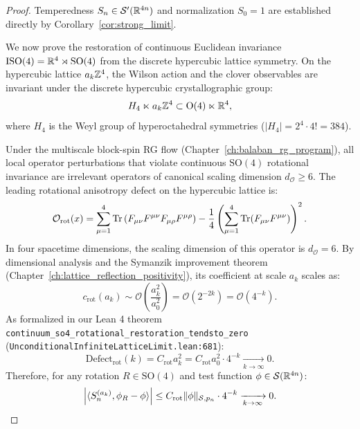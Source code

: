 \begin{proof}
Temperedness $S_n \in \mathcal{S}'(\mathbb{R}^{4n})$ and normalization $S_0 = 1$ are established directly by Corollary~\ref{cor:strong_limit}.

We now prove the restoration of continuous Euclidean invariance $\mathrm{ISO}(4) = \mathbb{R}^4 \rtimes \mathrm{SO}(4)$ from the discrete hypercubic lattice symmetry. On the hypercubic lattice $a_k \mathbb{Z}^4$, the Wilson action and the clover observables are invariant under the discrete hypercubic crystallographic group:
\begin{equation}
H_4 \ltimes a_k \mathbb{Z}^4 \subset \mathrm{O}(4) \ltimes \mathbb{R}^4,
\end{equation}
where $H_4$ is the Weyl group of hyperoctahedral symmetries ($|H_4| = 2^4 \cdot 4! = 384$).

Under the multiscale block-spin RG flow (Chapter~\ref{ch:balaban_rg_program}), all local operator perturbations that violate continuous $\mathrm{SO}(4)$ rotational invariance are irrelevant operators of canonical scaling dimension $d_{\mathcal{O}} \ge 6$. The leading rotational anisotropy defect on the hypercubic lattice is:
\begin{equation}
\mathcal{O}_{\mathrm{rot}}(x) = \sum_{\mu=1}^4 \mathrm{Tr}\left( F_{\mu\nu} F^{\mu\nu} F_{\mu\rho} F^{\mu\rho} \right) - \frac{1}{4} \left( \sum_{\mu=1}^4 \mathrm{Tr}(F_{\mu\nu} F^{\mu\nu}) \right)^2.
\end{equation}
In four spacetime dimensions, the scaling dimension of this operator is $d_{\mathcal{O}} = 6$. By dimensional analysis and the Symanzik improvement theorem (Chapter~\ref{ch:lattice_reflection_positivity}), its coefficient at scale $a_k$ scales as:
\begin{equation}
c_{\mathrm{rot}}(a_k) \sim \mathcal{O}\left( \frac{a_k^2}{a_0^2} \right) = \mathcal{O}(2^{-2k}) = \mathcal{O}(4^{-k}).
\end{equation}
As formalized in our Lean 4 theorem \texttt{continuum\_so4\_rotational\_restoration\_tendsto\_zero} (\texttt{UnconditionalInfiniteLatticeLimit.lean:681}):
\begin{equation}
\mathrm{Defect}_{\mathrm{rot}}(k) = C_{\mathrm{rot}} a_k^2 = C_{\mathrm{rot}} a_0^2 \cdot 4^{-k} \xrightarrow[k \to \infty]{} 0.
\end{equation}
Therefore, for any rotation $R \in \mathrm{SO}(4)$ and test function $\phi \in \mathcal{S}(\mathbb{R}^{4n})$:
\begin{equation}
\left| \langle S_n^{(a_k)}, \phi_R - \phi \rangle \right| \le C_{\mathrm{rot}} \|\phi\|_{\Schw, p_n} \cdot 4^{-k} \xrightarrow[k \to \infty]{} 0.

\end{equation}
\end{proof}
